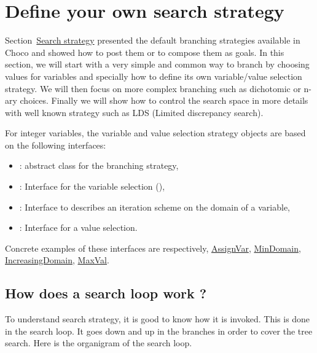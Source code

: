 \section{Define your own search strategy}\label{advanced:defineyourownsearchstrategy}\hypertarget{advanced:defineyourownsearchstrategy}{}
Section~\hyperlink{solver:searchstrategy}{Search strategy} presented the default branching strategies available in Choco and showed how to post them or to compose them as goals.
In this section, we will start with a very simple and common way to branch by choosing values for variables and specially how to define its own variable/value selection strategy. We will then focus on more complex branching such as dichotomic or n-ary choices. Finally we will show how to control the search space in more details with well known strategy such as LDS (Limited discrepancy search).

For integer variables, the variable and value selection strategy objects are based on the following interfaces:
\begin{itemize}
	\item {}: abstract class for the branching strategy,
	\item {} : Interface for the variable selection (),
	\item {} : Interface to describes an iteration scheme on the domain of a variable,
	\item {} : Interface for a value selection.
\end{itemize}

Concrete examples of these interfaces are respectively,  \hyperlink{assignvar:assignvarbranchstrat}{AssignVar}, \hyperlink{mindomain:mindomainvarselector}{MinDomain}, \hyperlink{increasingdomain:increasingdomainvaliterator}{IncreasingDomain}, \hyperlink{maxval:maxvalvalselector}{MaxVal}.


\subsection{How does a search loop work ?}\label{advanced:howdoesasearchloopwork}\hypertarget{advanced:howdoesasearchloopwork}{}
To understand search strategy, it is good to know how it is invoked. This is done in the search loop. It goes down and up in the branches in order to cover the tree search.
Here is the organigram of the search loop. 

